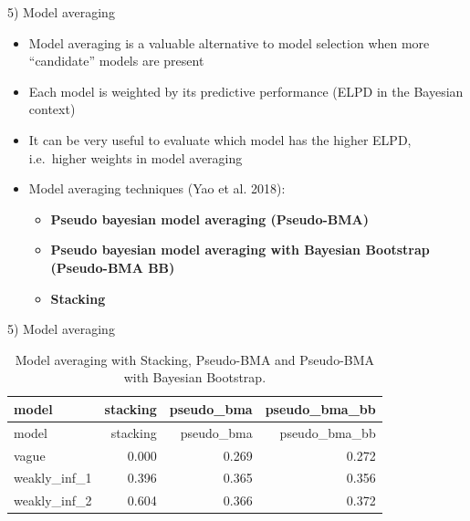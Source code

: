 \documentclass[ignorenonframetext,a4paper]{beamer}
\providecommand{\tightlist}{%
  \setlength{\itemsep}{0pt}\setlength{\parskip}{0pt}}
\begin{document}
\begin{frame}{5) Model averaging}

\begin{itemize}
\item
  Model averaging is a valuable alternative to model selection when more
  ``candidate'' models are present
\item
  Each model is weighted by its predictive performance (ELPD in the
  Bayesian context)
\item
  It can be very useful to evaluate which model has the higher ELPD,
  i.e.~higher weights in model averaging
\item
  Model averaging techniques (Yao et al. 2018):

  \begin{itemize}
  \tightlist
  \item
    \textbf{Pseudo bayesian model averaging (Pseudo-BMA)}
  \item
    \textbf{Pseudo bayesian model averaging with Bayesian Bootstrap
    (Pseudo-BMA BB)}
  \item
    \textbf{Stacking}
  \end{itemize}
\end{itemize}

\end{frame}

\begin{frame}{5) Model averaging}

\begin{longtable}[]{@{}lrrr@{}}
\caption{Model averaging with Stacking, Pseudo-BMA and Pseudo-BMA with
Bayesian Bootstrap.}\tabularnewline
\toprule
model & stacking & pseudo\_bma & pseudo\_bma\_bb\tabularnewline
\midrule
\endfirsthead
\toprule
model & stacking & pseudo\_bma & pseudo\_bma\_bb\tabularnewline
\midrule
\endhead
vague & 0.000 & 0.269 & 0.272\tabularnewline
weakly\_inf\_1 & 0.396 & 0.365 & 0.356\tabularnewline
weakly\_inf\_2 & 0.604 & 0.366 & 0.372\tabularnewline
\bottomrule
\end{longtable}

\end{frame}
\end{document}
